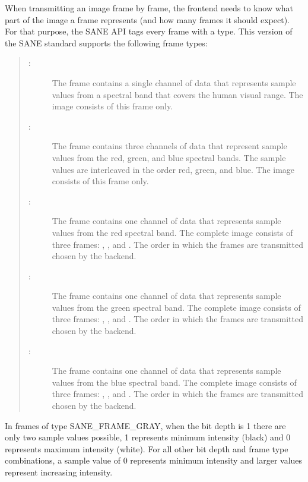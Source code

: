 \documentclass[11pt,DVIps]{report}
\begin{document}
When transmitting an image frame by frame, the frontend needs to know
what part of the image a frame represents (and how many frames it
should expect).  For that purpose, the SANE API tags every frame with
a type.  This version of the SANE standard supports the following
frame types:
\begin{quote}
\begin{description}

\item[:] The frame contains a single
  channel of data that represents sample values from a spectral band
  that covers the human visual range.  The image consists of this
  frame only.

\item[:] The frame contains three
  channels of data that represent sample values from the red, green,
  and blue spectral bands.  The sample values are interleaved in the
  order red, green, and blue.  The image consists of this frame only.

\item[:] The frame contains one channel
  of data that represents sample values from the red spectral band.
  The complete image consists of three frames:
  , , and
  .  The order in which the frames are
  transmitted chosen by the backend.

\item[:] The frame contains one
  channel of data that represents sample values from the green
  spectral band.  The complete image consists of three frames:
  , , and
  .  The order in which the frames are
  transmitted chosen by the backend.

\item[:] The frame contains one channel
  of data that represents sample values from the blue spectral band.
  The complete image consists of three frames:
  , , and
  .  The order in which the frames are
  transmitted chosen by the backend.

\end{description}
\end{quote}

In frames of type SANE\_FRAME\_GRAY, when the bit depth is 1 there are
only two sample values possible, 1 represents minimum intensity
(black) and 0 represents maximum intensity (white).  For all other bit
depth and frame type combinations, a sample value of 0 represents
minimum intensity and larger values represent increasing intensity.
\end{document}
